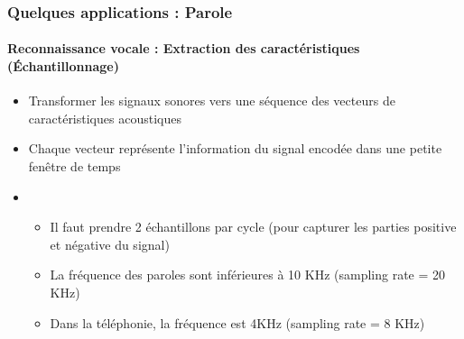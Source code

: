 \documentclass[xcolor=table]{beamer}
\begin{document}


\begin{frame}
	\frametitle{Quelques applications : Parole}
	\framesubtitle{Reconnaissance vocale : Extraction des caractéristiques (Échantillonnage)}
	\begin{itemize}
		\item Transformer les signaux sonores vers une séquence des vecteurs de caractéristiques acoustiques
		\item Chaque vecteur représente l'information du signal encodée dans une petite fenêtre de temps
		\item {}
		\begin{itemize}
			\item Il faut prendre 2 échantillons par cycle (pour capturer les parties positive et négative du signal)
			\item La fréquence des paroles sont inférieures à 10 KHz (sampling rate = 20 KHz)
			\item Dans la téléphonie, la fréquence est 4KHz (sampling rate = 8 KHz)
		\end{itemize}
	\end{itemize}
\end{frame}
\end{document}
